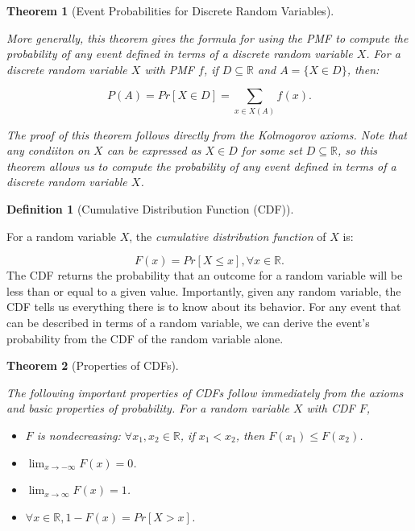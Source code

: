 \documentclass[
]{article}
\providecommand{\tightlist}{%
  \setlength{\itemsep}{0pt}\setlength{\parskip}{0pt}}
\newtheorem{theorem}{Theorem}[section]
\theoremstyle{definition}
\newtheorem{definition}{Definition}[section]
\theoremstyle{definition}
\theoremstyle{definition}
\theoremstyle{remark}
\begin{document}
\begin{theorem}[Event Probabilities for Discrete Random Variables]
\protect\hypertarget{thm:unlabeled-div-27}{}\label{thm:unlabeled-div-27}

More generally, this theorem gives the formula for using the \emph{PMF} to compute the probability of \emph{any} event defined in terms of a discrete random variable \(X\). For a discrete random variable \(X\) with \emph{PMF} \(f\), if \(D \subseteq \mathbb{R}\) and \(A = \{X \in D\}\), then:

\[P(A) = Pr[X \in D] = \sum_{x \in X(A)}f(x).\]

The proof of this theorem follows directly from the \emph{Kolmogorov axioms}. Note that any condiiton on \(X\) can be expressed as \(X \in D\) for some set \(D \subseteq \mathbb{R}\), so this theorem allows us to compute the probability of any event defined in terms of a discrete random variable \(X\).

\end{theorem}

\begin{definition}[Cumulative Distribution Function (CDF)]
\protect\hypertarget{def:unlabeled-div-28}{}\label{def:unlabeled-div-28}

For a random variable \(X\), the \emph{cumulative distribution function} of \(X\) is:

\[F(x) = Pr[X \leq x], \forall x \in \mathbb{R}.\]
The CDF returns the probability that an outcome for a random variable will be less than or equal to a given value. Importantly, given any random variable, the CDF tells us everything there is to know about its behavior. For any event that can be described in terms of a random variable, we can derive the event's probability from the CDF of the random variable alone.

\end{definition}

\begin{theorem}[Properties of CDFs]
\protect\hypertarget{thm:unlabeled-div-29}{}\label{thm:unlabeled-div-29}

The following important properties of CDFs follow immediately from the axioms and basic properties of probability. For a random variable \(X\) with CDF \(F\),

\begin{itemize}
\tightlist
\item
  \(F\) is nondecreasing: \(\forall x_1, x_2 \in \mathbb{R}\), if \(x_1 < x_2\), then \(F(x_1) \leq F(x_2)\).
\item
  \(\lim_{x \to -\infty} F(x) = 0\).
\item
  \(\lim_{x \to \infty} F(x) = 1\).
\item
  \(\forall x \in \mathbb{R}, 1-F(x) = Pr[X > x]\).
\end{itemize}

\end{theorem}
\end{document}
